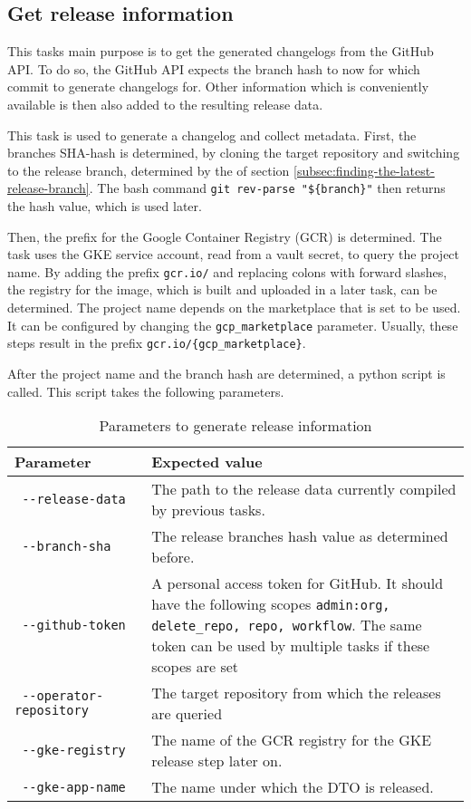 \subsection{Get release information}\label{subsec:get-release-information}

This tasks main purpose is to get the generated changelogs from the GitHub API.
To do so, the GitHub API expects the branch hash to now for which commit to generate changelogs for.
Other information which is conveniently available is then also added to the resulting release data.

This task is used to generate a changelog and collect metadata.
First, the branches SHA-hash is determined, by cloning the target repository and switching to the release branch, determined by the of section \ref{subsec:finding-the-latest-release-branch}.
The bash command \verb|git rev-parse "${branch}"| then returns the hash value, which is used later.

Then, the prefix for the Google Container Registry (GCR) is determined.
The task uses the GKE service account, read from a vault secret, to query the project name.
By adding the prefix \verb|gcr.io/| and replacing colons with forward slashes, the registry for the image, which is built and uploaded in a later task, can be determined.
The project name depends on the marketplace that is set to be used.
It can be configured by changing the \verb|gcp_marketplace| parameter.
Usually, these steps result in the prefix \verb|gcr.io/{gcp_marketplace}|.

After the project name and the branch hash are determined, a python script is called.
This script takes the following parameters.

\begin{table}
    \centering
    \caption{Parameters to generate release information}
    \label{tab:params-to-generate-release-information}
    \begin{tabular}{p{0.3\linewidth}|p{0.7\linewidth}}
        Parameter & Expected value \\
        \hline
        \verb| --release-data | & The path to the release data currently compiled by previous tasks.  \\
        \verb| --branch-sha | & The release branches hash value as determined before. \\
        \verb| --github-token | & A personal access token for GitHub. It should have the following scopes \verb|admin:org, delete_repo, repo, workflow|. The same token can be used by multiple tasks if these scopes are set \\
        \verb| --operator-repository | & The target repository from which the releases are queried \\
        \verb| --gke-registry | & The name of the GCR registry for the GKE release step later on. \\
        \verb| --gke-app-name | & The name under which the DTO is released. \\
    \end{tabular}
\end{table}

